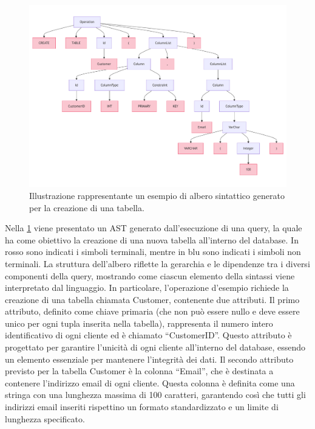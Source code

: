\documentclass[12pt,a4paper,openright,twoside]{book}
\begin{document}
\begin{figure}
\centering
\includegraphics[width=.9\linewidth]{figures/create-table-ast.pdf}
\caption{Illustrazione rappresentante un esempio di albero sintattico generato per la creazione di una tabella.}
\label{fig:create-table-ast}
\end{figure}

Nella \cref{fig:create-table-ast} viene presentato un AST generato dall’esecuzione di una query, la quale ha come obiettivo la 
creazione di una nuova tabella all’interno del database. In rosso sono indicati i simboli terminali, mentre in blu sono indicati i 
simboli non terminali. La struttura dell’albero riflette la gerarchia e le dipendenze tra i diversi componenti della query, 
mostrando come ciascun elemento della sintassi viene interpretato dal linguaggio. In particolare, l’operazione d’esempio richiede 
la creazione di una tabella chiamata Customer, contenente due attributi. Il primo attributo, definito come chiave primaria (che non 
può essere nullo e deve essere unico per ogni tupla inserita nella tabella), rappresenta il numero intero identificativo di ogni 
cliente ed è chiamato ``CustomerID''. Questo attributo è progettato per garantire l’unicità di ogni cliente all’interno del database, 
essendo un elemento essenziale per mantenere l’integrità dei dati. Il secondo attributo previsto per la tabella Customer è la 
colonna ``Email'', che è destinata a contenere l’indirizzo email di ogni cliente. Questa colonna è definita come una stringa con una 
lunghezza massima di 100 caratteri, garantendo così che tutti gli indirizzi email inseriti rispettino un formato standardizzato e 
un limite di lunghezza specificato.
\end{document}
